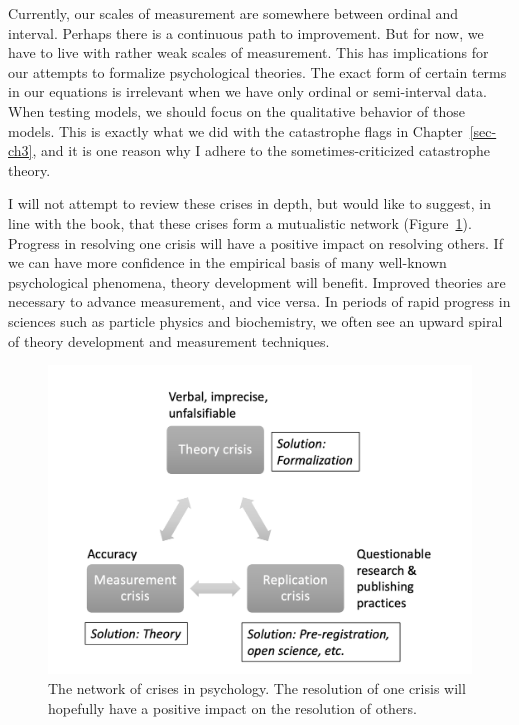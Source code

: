 \documentclass[
  a4paper,
  DIV=11,
  numbers=noendperiod,
  oneside]{scrreprt}
\begin{document}
Currently, our scales of measurement are somewhere between ordinal and
interval. Perhaps there is a continuous path to improvement. But for
now, we have to live with rather weak scales of measurement. This has
implications for our attempts to formalize psychological theories. The
exact form of certain terms in our equations is irrelevant when we have
only ordinal or semi-interval data. When testing models, we should focus
on the qualitative behavior of those models. This is exactly what we did
with the catastrophe flags in Chapter~\ref{sec-ch3}, and it is one
reason why I adhere to the sometimes-criticized catastrophe theory.

I will not attempt to review these crises in depth, but would like to
suggest, in line with the book, that these crises form a mutualistic
network (Figure~\ref{fig-ch8-extra}). Progress in resolving one crisis
will have a positive impact on resolving others. If we can have more
confidence in the empirical basis of many well-known psychological
phenomena, theory development will benefit. Improved theories are
necessary to advance measurement, and vice versa. In periods of rapid
progress in sciences such as particle physics and biochemistry, we often
see an upward spiral of theory development and measurement techniques.

\begin{figure}

{\centering \includegraphics{media/ch8/ch8-fig1-extra.png}

}

\caption{\label{fig-ch8-extra}The network of crises in psychology. The
resolution of one crisis will hopefully have a positive impact on the
resolution of others.}

\end{figure}
\end{document}
